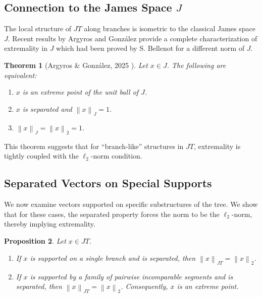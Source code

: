 \documentclass[11pt,a4paper]{amsart}
\newtheorem{theorem}{Theorem}[section]
\newtheorem{proposition}[theorem]{Proposition}
\newcommand{\JT}{JT}
\newcommand{\norm}[1]{\left\lVert#1\right\rVert}
\newcommand{\J}{J}
\begin{document}
\subsection{Connection to the James Space $\J$}
The local structure of $\JT$ along branches is isometric to the classical James space $\J$. Recent results by Argyros and González provide a complete characterization of extremality in $\J$ which had  been proved by S. Bellenot \cite{B} for a different norm of $\J$.

\begin{theorem}[Argyros \& González, 2025 \cite{AG2025}]\label{thm:James_space}
    Let $x \in \J$. The following are equivalent:
    \begin{enumerate}
        \item $x$ is an extreme point of the unit ball of $\J$.
        \item $x$ is separated and $\norm{x}_{\J}=1$.
        \item $\norm{x}_{\J} = \norm{x}_2 = 1$.
    \end{enumerate}
\end{theorem}

This theorem suggests that for ``branch-like'' structures in $\JT$, extremality is tightly coupled with the $\ell_2$-norm condition.

\subsection{Separated Vectors on Special Supports}

We now examine vectors supported on specific substructures of the tree. We show that for these cases, the separated property forces the norm to be the $\ell_2$-norm, thereby implying extremality.

\begin{proposition}\label{prop:special_supports}
    Let $x \in \JT$.
    \begin{enumerate}[label=(\alph*)]
        \item If $x$ is supported on a single branch and is separated, then $\norm{x}_{\JT} = \norm{x}_2$.
        \item If $x$ is supported by a family of pairwise incomparable segments and is separated, then $\norm{x}_{\JT} = \norm{x}_2$. Consequently, $x$ is an extreme point.
    \end{enumerate}
\end{proposition}
\end{document}

